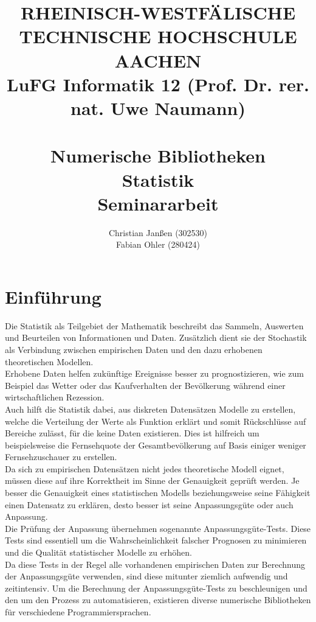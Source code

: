 \documentclass{article}
\title{
{\bf \scriptsize RHEINISCH-WESTF\"ALISCHE TECHNISCHE HOCHSCHULE AACHEN \\
LuFG Informatik 12 (Prof. Dr. rer. nat. Uwe Naumann)}
\vspace{.5cm} \\
\epsfig{file=figures/STCE_Logo_WWW.eps,width=.7\textwidth}
\vspace{1cm} \\
{\bf \Large Numerische Bibliotheken} \\
{\bf \large Statistik} \\
{\large Seminararbeit} 
}
\author{Christian Janßen (302530) \\ Fabian Ohler (280424) }
\begin{document}

\begin{titlepage}
\thispagestyle{empty}
\maketitle
\end{titlepage}

\pagestyle{headings}
\newpage
\section{Einführung}
Die Statistik als Teilgebiet der Mathematik beschreibt das Sammeln, Auswerten und Beurteilen von Informationen und Daten.
Zusätzlich dient sie der Stochastik als Verbindung zwischen empirischen Daten und den dazu erhobenen theoretischen Modellen.\\
Erhobene Daten helfen zukünftige Ereignisse besser zu prognostizieren, wie zum Beispiel das Wetter oder das Kaufverhalten der Bevölkerung während einer wirtschaftlichen Rezession.\\
Auch hilft die Statistik dabei, aus diskreten Datensätzen Modelle zu erstellen, welche die Verteilung der Werte als Funktion erklärt und somit Rückschlüsse auf Bereiche zulässt, für die keine Daten existieren. Dies ist hilfreich um beispielsweise die Fernsehquote der Gesamtbevölkerung auf Basis einiger weniger Fernsehzuschauer zu erstellen.\\
Da sich zu empirischen Datensätzen nicht jedes theoretische Modell eignet, müssen diese auf ihre Korrektheit im Sinne der Genauigkeit geprüft werden. Je besser die Genauigkeit eines statistischen Modells beziehungsweise seine Fähigkeit einen Datensatz zu erklären, desto besser ist seine Anpassungsgüte oder auch Anpassung.\\
Die Prüfung der Anpassung übernehmen sogenannte Anpassungsgüte-Tests. Diese Tests sind essentiell um die Wahrscheinlichkeit falscher Prognosen zu minimieren und die Qualität statistischer Modelle zu erhöhen.\\
Da diese Tests in der Regel alle vorhandenen empirischen Daten zur Berechnung der Anpassungsgüte verwenden, sind diese mitunter ziemlich aufwendig und zeitintensiv. Um die Berechnung der Anpassungsgüte-Tests zu beschleunigen und den um den Prozess zu automatisieren, existieren diverse numerische Bibliotheken für verschiedene Programmiersprachen.\\
\end{document}
